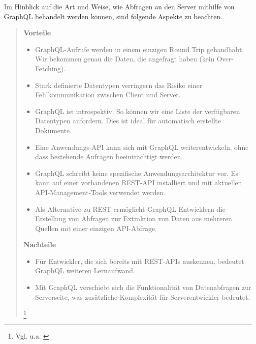 Im Hinblick auf die Art und Weise, wie Abfragen an den Server mithilfe von
\\ GraphQL behandelt werden können, sind folgende Aspekte zu beachten.
\\
\begin{quote}
  \textbf{Vorteile}\\
  \begin{itemize}
    \item
          GraphQL-Aufrufe werden in einem einzigen Round Trip gehandhabt. Wir bekommen genau die Daten, die angefragt haben (kein Over-Fetching).

    \item
          Stark definierte Datentypen verringern das Risiko einer Fehlkommunikation zwischen Client und Server.

    \item
          GraphQL ist introspektiv. So können wir eine Liste der verfügbaren Datentypen anfordern. Dies ist ideal für automatisch erstellte Dokumente.

    \item
          Eine Anwendungs-API kann sich mit GraphQL weiterentwickeln, ohne dass bestehende Anfragen beeinträchtigt werden.
    \item
          GraphQL schreibt keine spezifische Anwendungsarchitektur vor. Es kann auf einer vorhandenen REST-API installiert und mit aktuellen API-Management-Tools verwendet werden.
    \item
          Als Alternative zu REST ermöglicht GraphQL Entwicklern die Erstellung von Abfragen zur Extraktion von Daten aus mehreren Quellen mit einer einzigen API-Abfrage.

  \end{itemize}

  \textbf{Nachteile}
  \begin{itemize}
    \item
          Für Entwickler, die sich bereits mit REST-APIs auskennen, bedeutet GraphQL weiteren Lernaufwand.
    \item
          Mit GraphQL verschiebt sich die Funktionalität von Datenabfragen zur Serverseite, was zusätzliche Komplexität für Serverentwickler bedeutet.

  \end{itemize}

  \footnote{Vgl. u.a. \cite{RH1}}
\end{quote}

